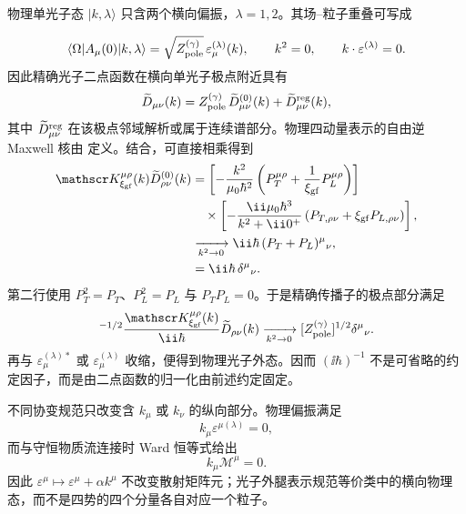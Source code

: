 \begin{derivation}
物理单光子态 $|k,\lambda\rangle$ 只含两个横向偏振，$\lambda=1,2$。其场--粒子重叠可写成

\begin{equation*}
 \langle\Omega|A_\mu(0)|k,\lambda\rangle
 =\sqrt{Z_{\rm pole}^{(\gamma)}}\,\varepsilon_\mu^{(\lambda)}(k),
 \qquad
 k^2=0,
 \qquad
 k\cdot\varepsilon^{(\lambda)}=0.
\end{equation*}
因此精确光子二点函数在横向单光子极点附近具有
\begin{equation*}
 \widetilde D_{\mu\nu}(k)
 =Z_{\rm pole}^{(\gamma)}\,\widetilde D^{(0)}_{\mu\nu}(k)
 +\widetilde D^{\rm reg}_{\mu\nu}(k),
\end{equation*}
其中 $\widetilde D^{\rm reg}_{\mu\nu}$ 在该极点邻域解析或属于连续谱部分。物理四动量表示的自由逆 Maxwell 核由 定义。结合，可直接相乘得到
\begin{align*}
 \mathscr K_{\xi_{\rm gf}}^{\mu\rho}(k)
 \widetilde D^{(0)}_{\rho\nu}(k)
 &=\left[-\frac{k^2}{\mu_0\hbar^2}
 \left(P_T^{\mu\rho}+\frac1{\xi_{\rm gf}}P_L^{\mu\rho}\right)\right]\\
 &\quad\times
 \left[-\frac{\ii\mu_0\hbar^3}{k^2+\ii0^+}
 \left(P_{T,\rho\nu}+\xi_{\rm gf}P_{L,\rho\nu}\right)\right],\\
 &\xrightarrow[k^2\to0]{}\ii\hbar\,
 (P_T+P_L)^\mu{}_{\nu},\\
 &=\ii\hbar\,\delta^\mu{}_{\nu}.
\end{align*}
第二行使用 $P_T^2=P_T$、$P_L^2=P_L$ 与 $P_TP_L=0$。于是精确传播子的极点部分满足
\begin{equation*}
 [Z_{\rm pole}^{(\gamma)}]^{-1/2}\frac{\mathscr K_{\xi_{\rm gf}}^{\mu\rho}(k)}{\ii\hbar}
 \widetilde D_{\rho\nu}(k)
 \xrightarrow[k^2\to0]{}
 [Z_{\rm pole}^{(\gamma)}]^{1/2}\delta^\mu{}_{\nu}.
\end{equation*}
再与 $\varepsilon_\mu^{(\lambda)*}$ 或 $\varepsilon_\mu^{(\lambda)}$ 收缩，便得到物理光子外态。因而 $(\ii\hbar)^{-1}$ 不是可省略的约定因子，而是由二点函数的归一化由前述约定固定。

不同协变规范只改变含 $k_\mu$ 或 $k_\nu$ 的纵向部分。物理偏振满足
\begin{equation*}
 k_\mu\varepsilon^{\mu(\lambda)}=0,
\end{equation*}
而与守恒物质流连接时 Ward 恒等式给出
\begin{equation*}
 k_\mu\mathcal M^\mu=0.
\end{equation*}
因此 $\varepsilon^\mu\mapsto\varepsilon^\mu+\alpha k^\mu$ 不改变散射矩阵元；光子外腿表示规范等价类中的横向物理态，而不是四势的四个分量各自对应一个粒子。
\end{derivation}

